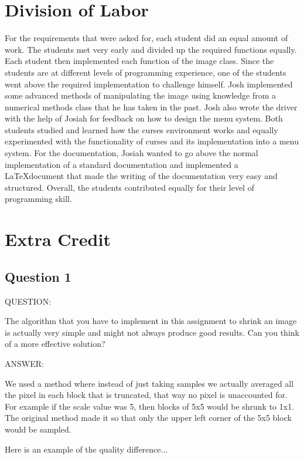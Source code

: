 \documentclass[pdftex, 11pt]{article}
\begin{document}
\section{Division of Labor}

For the requirements that were asked for, each student did an equal amount of work. The students met very early and
divided up the required functions equally. Each student then implemented each function of the image class. Since the
students are at different levels of programming experience, one of the students went above the required implementation
to challenge himself. Josh implemented some advanced methods of manipulating the image using knowledge from a numerical
methods class that he has taken in the past. Josh also wrote the driver with the help of Josiah for feedback on how to
design the menu system. Both students studied and learned how the curses environment works and equally experimented with
the functionality of curses and its implementation into a menu system. For the documentation, Josiah wanted to go above
the normal implementation of a standard documentation and implemented a \LaTeX document that made the writing of the
documentation very easy and structured. Overall, the students contributed equally for their level of programming skill.

\section{Extra Credit}

	\subsection{Question 1}	

		\begin{description}

			\item{QUESTION:}

				The algorithm that you have to implement in this assignment to shrink an image
				is actually very simple and might not always produce good results. Can you think of a more
				effective solution?
			
			\item{ANSWER:}

				We used a method where instead of just taking samples we actually averaged all the pixel in each
				block that is truncated, that way no pixel is unaccounted for.  For example if the scale value was
				5, then blocks of 5x5 would be shrunk to 1x1.  The original method made it so that only the upper
				left corner of the 5x5 block would be sampled. 

				Here is an example of the quality difference...
				
		\end{description}
\end{document}
